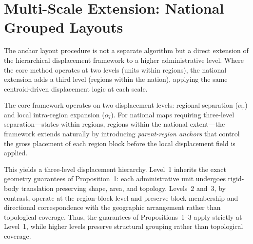 \documentclass[12pt, a4paper]{article}
\numberwithin{equation}{section}
\begin{document}
\section{Multi-Scale Extension: National Grouped Layouts}
\label{sec:multiscale}

The anchor layout procedure is not a separate algorithm but a direct extension of the hierarchical displacement framework to a higher administrative level. Where the core method operates at two levels (units within regions), the national extension adds a third level (regions within the nation), applying the same centroid-driven displacement logic at each scale.

The core framework operates on two displacement levels: regional separation ($\alpha_r$) and local intra-region expansion ($\alpha_l$). For national maps requiring three-level separation---states within regions, regions within the national extent---the framework extends naturally by introducing \emph{parent-region anchors} that control the gross placement of each region block before the local displacement field is applied.

This yields a three-level displacement hierarchy. Level~1 inherits the exact geometry guarantees of Proposition~1: each administrative unit undergoes rigid-body translation preserving shape, area, and topology. Levels~2 and~3, by contrast, operate at the region-block level and preserve block membership and directional correspondence with the geographic arrangement rather than topological coverage. Thus, the guarantees of Propositions~1--3 apply strictly at Level~1, while higher levels preserve structural grouping rather than topological coverage.
\end{document}
